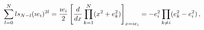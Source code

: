 \begin{equation}
\sum_{l=0}^{N}ls_{N-l}(\imath e_{i})^{2l}=\frac{\imath e_{i}}{2}\left[ \frac{%
d}{dx}\prod_{k=1}^{N}(x^{2}+e_{k}^{2})\right] _{x=\imath
e_{i}}=-e_{i}^{2}\prod_{k\neq i}(e_{k}^{2}-e_{i}^{2})\,,
\end{equation}

